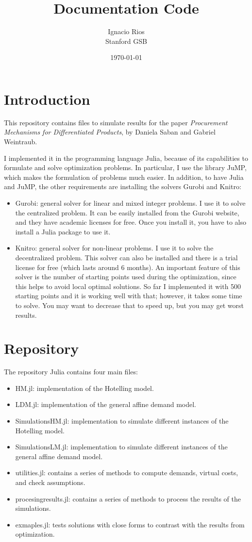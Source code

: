 \documentclass[11pt, oneside]{article}
\title{Documentation Code}
\author{Ignacio Rios \\ Stanford GSB}
\date{\today}
\begin{document}
\maketitle
\section{Introduction}
This repository contains files to simulate results for the paper \emph{Procurement
Mechanisms for Differentiated Products}, by Daniela Saban and Gabriel Weintraub.

I implemented it in the programming language Julia, because of its capabilities to
formulate and solve optimization problems. In particular, I use the library JuMP,
which makes the formulation of problems much easier. In addition, to have Julia and
JuMP, the other requirements are installing the solvers Gurobi and Knitro:
\begin{itemize}
    \item Gurobi: general solver for linear and mixed integer problems. I use it to solve the centralized
    problem. It can be easily installed from the Gurobi website, and they have academic
    licenses for free. Once you install it, you have to also install a Julia package to
    use it.
    \item Knitro: general solver for non-linear problems. I use it to solve the decentralized
    problem. This solver can also be installed and there is a trial license for free (which lasts
    around 6 months). An important feature of this solver is the number of starting points
    used during the optimization, since this helps to avoid local optimal solutions.
    So far I implemented it with 500 starting points and it is working well with that;
    however, it takes some time to solve. You may want to decrease that to speed up,
    but you may get worst results.
\end{itemize}

\section{Repository}

The repository Julia contains four main files:
\begin{itemize}
    \item HM.jl: implementation of the Hotelling model.
    \item LDM.jl: implementation of the general affine demand model.
    \item SimulationsHM.jl: implementation to simulate different instances of the Hotelling model.
    \item SimulationsLM.jl: implementation to simulate different instances of the general affine demand model.
    \item utilities.jl: contains a series of methods to compute demands, virtual costs, and check assumptions.
    \item procesingresults.jl: contains a series of methods to process the results of the simulations.
    \item exmaples.jl: tests solutions with close forms to contrast with the results from optimization.
\end{itemize}
\end{document}
